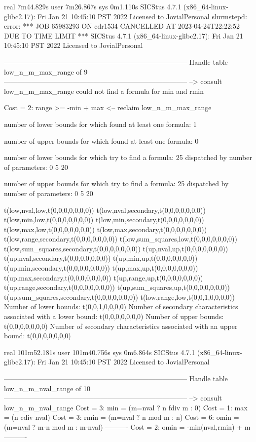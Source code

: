 real	7m44.829s
user	7m26.867s
sys	0m1.110s
SICStus 4.7.1 (x86_64-linux-glibc2.17): Fri Jan 21 10:45:10 PST 2022
Licensed to JovialPersonal
slurmstepd: error: *** JOB 65983293 ON cdr1534 CANCELLED AT 2023-04-24T22:22:52 DUE TO TIME LIMIT ***
SICStus 4.7.1 (x86_64-linux-glibc2.17): Fri Jan 21 10:45:10 PST 2022
Licensed to JovialPersonal


--------------------------------------------------------------------------------
Handle table low_n_m_max_range of 9
--------------------------------------------------------------------------------
--> consult low_n_m_max_range
could not find a formula for min and rmin

Cost =  2:  range >= -min + max
<-- reclaim low_n_m_max_range

number of lower bounds for which found at least one formula: 1

number of upper bounds for which found at least one formula: 0

number of lower bounds for which try to find a formula: 25
dispatched by number of parameters: 0  5  20

number of upper bounds for which try to find a formula: 25
dispatched by number of parameters: 0  5  20

t(low,nval,low,t(0,0,0,0,0,0,0))
t(low,nval,secondary,t(0,0,0,0,0,0,0))
t(low,min,low,t(0,0,0,0,0,0,0))
t(low,min,secondary,t(0,0,0,0,0,0,0))
t(low,max,low,t(0,0,0,0,0,0,0))
t(low,max,secondary,t(0,0,0,0,0,0,0))
t(low,range,secondary,t(0,0,0,0,0,0,0))
t(low,sum_squares,low,t(0,0,0,0,0,0,0))
t(low,sum_squares,secondary,t(0,0,0,0,0,0,0))
t(up,nval,up,t(0,0,0,0,0,0,0))
t(up,nval,secondary,t(0,0,0,0,0,0,0))
t(up,min,up,t(0,0,0,0,0,0,0))
t(up,min,secondary,t(0,0,0,0,0,0,0))
t(up,max,up,t(0,0,0,0,0,0,0))
t(up,max,secondary,t(0,0,0,0,0,0,0))
t(up,range,up,t(0,0,0,0,0,0,0))
t(up,range,secondary,t(0,0,0,0,0,0,0))
t(up,sum_squares,up,t(0,0,0,0,0,0,0))
t(up,sum_squares,secondary,t(0,0,0,0,0,0,0))
t(low,range,low,t(0,0,1,0,0,0,0))
Number of lower bounds:                                             t(0,0,1,0,0,0,0)
Number of secondary characteristics associated with a lower bound:  t(0,0,0,0,0,0,0)
Number of upper bounds:                                             t(0,0,0,0,0,0,0)
Number of secondary characteristics associated with an upper bound: t(0,0,0,0,0,0,0)

real	101m52.181s
user	101m40.756s
sys	0m6.864s
SICStus 4.7.1 (x86_64-linux-glibc2.17): Fri Jan 21 10:45:10 PST 2022
Licensed to JovialPersonal


--------------------------------------------------------------------------------
Handle table low_n_m_nval_range of 10
--------------------------------------------------------------------------------
--> consult low_n_m_nval_range
Cost =  3:  min  = (m=nval ? n fdiv m : 0)
Cost =  1:  max  = (n cdiv nval)
Cost =  3:  rmin = (m=nval ? n mod m : n)
Cost =  6:  omin = (m=nval ? m-n mod m : m-nval)
----------
Cost =  2:  omin = -min(nval,rmin) + m
----------

